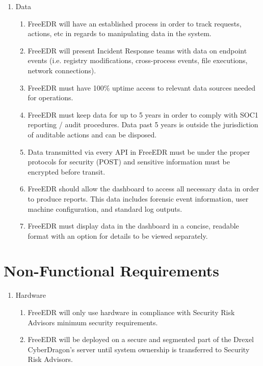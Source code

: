 \documentclass{scrreprt}
\begin{document}
\begin{enumerate}[resume*]
    \item Data
    \begin{enumerate}[label*=\arabic*.]
\item FreeEDR will have an established process in order to track requests, actions, etc in regards to manipulating data in the system.
\item FreeEDR will present Incident Response teams with data on endpoint events (i.e. registry modifications, cross-process events, file executions, network connections).
\item FreeEDR must have 100\% uptime access to relevant data sources needed for operations. 
\item FreeEDR must keep data for up to 5 years in order to comply with SOC1 reporting / audit procedures. Data past 5 years is outside the jurisdiction of auditable actions and can be disposed.
\item Data transmitted via every API in FreeEDR must be under the proper protocols for security (POST) and sensitive information must be encrypted before transit.
\item FreeEDR should allow the dashboard to access all necessary data in order to produce reports. This data includes forensic event information, user machine configuration, and standard log outputs.\
\item FreeEDR must display data in the dashboard in a concise, readable format with an option for details to be viewed separately. 
\end{enumerate}
\end{enumerate}


\section{Non-Functional Requirements}

\begin{enumerate}[label*=N\arabic*.]
    \item Hardware
    \begin{enumerate}[label*=\arabic*.]
\item FreeEDR will only use hardware in compliance with Security Risk Advisors minimum security requirements. 
\item FreeEDR will be deployed on a secure and segmented part of the Drexel CyberDragon’s server until system ownership is transferred to Security Risk Advisors.
    \end{enumerate}
\end{enumerate}
\end{document}
